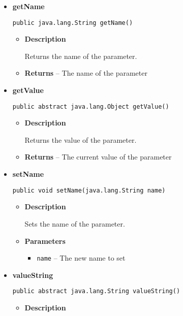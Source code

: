 {{{{{{{{{\begin{itemize}
{\begin{itemize}
{Returns all listener listening to changes of this parameter.
}
\item{{\bf  Returns} -- 
A list of listeners 
}%
\end{itemize}
}%
\item{ 
{\bf  getName}\\
\begin{lstlisting}[frame=none]
public java.lang.String getName()\end{lstlisting} %
\begin{itemize}
\item{
{\bf  Description}

Returns the name of the parameter.
}
\item{{\bf  Returns} -- 
The name of the parameter 
}%
\end{itemize}
}%
\item{ 
{\bf  getValue}\\
\begin{lstlisting}[frame=none]
public abstract java.lang.Object getValue()\end{lstlisting} %
\begin{itemize}
\item{
{\bf  Description}

Returns the value of the parameter.
}
\item{{\bf  Returns} -- 
The current value of the parameter 
}%
\end{itemize}
}%
\item{ 
{\bf  setName}\\
\begin{lstlisting}[frame=none]
public void setName(java.lang.String name)\end{lstlisting} %
\begin{itemize}
\item{
{\bf  Description}

Sets the name of the parameter.
}
\item{
{\bf  Parameters}
  \begin{itemize}
   \item{
\texttt{name} -- The new name to set}
  \end{itemize}
}%
\end{itemize}
}%
\item{ 
{\bf  valueString}\\
\begin{lstlisting}[frame=none]
public abstract java.lang.String valueString()\end{lstlisting} %
\begin{itemize}
\item{
{\bf  Description}

}
\end{itemize}}
\end{itemize}}}}}}}}}}
